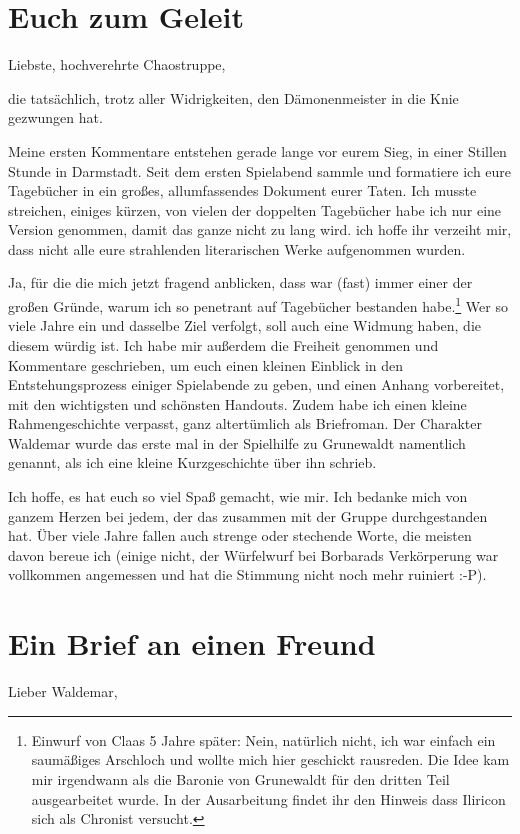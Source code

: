 \chapter{Euch zum Geleit}
Liebste, hochverehrte Chaostruppe, 

die tatsächlich, trotz aller Widrigkeiten, den Dämonenmeister in die Knie gezwungen hat.

Meine ersten Kommentare entstehen gerade lange vor eurem Sieg, in einer Stillen Stunde in Darmstadt. Seit dem ersten Spielabend sammle und formatiere ich eure Tagebücher in ein großes, allumfassendes Dokument eurer Taten. Ich musste streichen, einiges kürzen, von vielen der doppelten Tagebücher habe ich nur eine Version genommen, damit das ganze nicht zu lang wird. ich hoffe ihr verzeiht mir, dass nicht alle eure strahlenden literarischen Werke aufgenommen wurden.

Ja, für die die mich jetzt fragend anblicken, dass war (fast) immer einer der großen Gründe, warum ich so penetrant auf Tagebücher bestanden habe.\footnote{Einwurf von Claas 5 Jahre später: Nein, natürlich nicht, ich war einfach ein saumäßiges Arschloch und wollte mich hier geschickt rausreden. Die Idee kam mir irgendwann als die Baronie von Grunewaldt für den dritten Teil ausgearbeitet wurde. In der Ausarbeitung findet ihr den Hinweis dass Iliricon sich als Chronist versucht.} Wer so viele Jahre ein und dasselbe Ziel verfolgt, soll auch eine Widmung haben, die diesem würdig ist. Ich habe mir außerdem die Freiheit genommen und Kommentare geschrieben, um euch einen kleinen Einblick in den Entstehungsprozess einiger Spielabende zu geben, und einen Anhang vorbereitet, mit den wichtigsten und schönsten Handouts.
Zudem habe ich einen kleine Rahmengeschichte verpasst, ganz altertümlich als Briefroman. Der Charakter Waldemar wurde das erste mal in der Spielhilfe zu Grunewaldt namentlich genannt, als ich eine kleine Kurzgeschichte über ihn schrieb.

Ich hoffe, es hat euch so viel Spaß gemacht, wie mir. Ich bedanke mich von ganzem Herzen bei jedem, der das zusammen mit der Gruppe durchgestanden hat. Über viele Jahre fallen auch strenge oder stechende Worte, die meisten davon bereue ich (einige nicht, der Würfelwurf bei Borbarads Verkörperung war vollkommen angemessen und hat die Stimmung nicht noch mehr ruiniert :-P).

\chapter{Ein Brief an einen Freund}
Lieber Waldemar,

